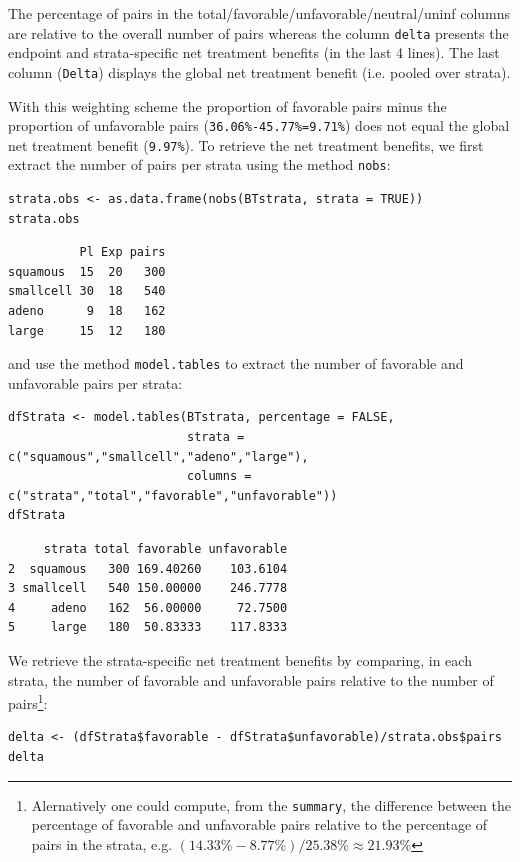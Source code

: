 \documentclass[12pt]{article}
\newcommand\Warning[1][3ex]{%
\renewcommand\stacktype{L}%
\scaleto{\stackon[1.3pt]{\color{red}$\triangle$}{\tiny\bfseries !}}{#1}%
\xspace
}
\begin{document}
The percentage of pairs in the
total/favorable/unfavorable/neutral/uninf columns are relative to the
overall number of pairs whereas the column \texttt{delta} presents the
endpoint and strata-specific net treatment benefits (in the last 4 lines). The
last column (\texttt{Delta}) displays the global net treatment benefit (i.e. pooled
over strata). \newline \Warning With this weighting scheme the
proportion of favorable pairs minus the proportion of unfavorable
pairs (\texttt{36.06\%-45.77\%=9.71\%}) does not equal the global net treatment benefit
(\texttt{9.97\%}). To retrieve the net treatment benefits, we first extract the number
of pairs per strata using the method \texttt{nobs}:
\lstset{language=r,label= ,caption= ,captionpos=b,numbers=none}
\begin{lstlisting}
strata.obs <- as.data.frame(nobs(BTstrata, strata = TRUE))
strata.obs
\end{lstlisting}

\begin{verbatim}
          Pl Exp pairs
squamous  15  20   300
smallcell 30  18   540
adeno      9  18   162
large     15  12   180
\end{verbatim}


and use the method \texttt{model.tables} to extract the number of favorable and unfavorable
pairs per strata:
\lstset{language=r,label= ,caption= ,captionpos=b,numbers=none}
\begin{lstlisting}
dfStrata <- model.tables(BTstrata, percentage = FALSE,
                         strata = c("squamous","smallcell","adeno","large"),
                         columns = c("strata","total","favorable","unfavorable"))
dfStrata
\end{lstlisting}

\begin{verbatim}
     strata total favorable unfavorable
2  squamous   300 169.40260    103.6104
3 smallcell   540 150.00000    246.7778
4     adeno   162  56.00000     72.7500
5     large   180  50.83333    117.8333
\end{verbatim}


We retrieve the strata-specific net treatment benefits by comparing, in each
strata, the number of favorable and unfavorable pairs relative to the
number of pairs\footnote{Alernatively one could compute, from the \texttt{summary}, the difference
between the percentage of favorable and unfavorable pairs relative to
the percentage of pairs in the strata, e.g. \((14.33\%-8.77\%)/25.38\%
\approx 21.93\%\)}:
\lstset{language=r,label= ,caption= ,captionpos=b,numbers=none}
\begin{lstlisting}
delta <- (dfStrata$favorable - dfStrata$unfavorable)/strata.obs$pairs
delta
\end{lstlisting}
\end{document}

